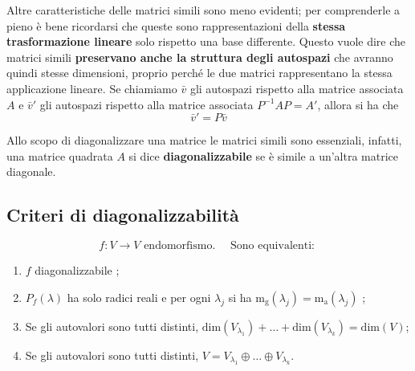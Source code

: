 \documentclass[x11names]{article}
\begin{document}
\noindent
Altre caratteristiche delle matrici simili sono meno evidenti; per comprenderle a pieno è bene ricordarsi che queste sono rappresentazioni della \textbf{stessa trasformazione lineare} solo rispetto una base differente. Questo vuole dire che matrici simili \textbf{preservano anche la struttura degli autospazi} che avranno quindi stesse dimensioni, proprio perché le due matrici rappresentano la stessa applicazione lineare. Se chiamiamo $\bar{v}$ gli autospazi rispetto alla matrice associata $A$ e $\bar{v}'$ gli autospazi rispetto alla matrice associata $P^{-1}AP = A'$, allora si ha che 
\[
\bar{v}' = P\bar{v}
\]

\noindent
Allo scopo di diagonalizzare una matrice le matrici simili sono essenziali, infatti, una matrice quadrata $A$ si dice \textbf{diagonalizzabile} se è simile a un'altra matrice diagonale.

\subsection{Criteri di diagonalizzabilità}
 \[
f: V \longrightarrow V \text{ endomorfismo.} \quad \text{ Sono equivalenti: }
\] 
\begin{enumerate}
	\item $f$ diagonalizzabile ;
	\item $P_{f}\left(\lambda\right)$ ha solo radici reali e per ogni $\lambda_{j}$ si ha $\text{m}_{\text{g}}\left(\lambda_{j}\right) = \text{m}_{\text{a}}\left(\lambda_{j}\right)$ ;
	\item Se gli autovalori sono tutti distinti, $\text{dim}\left(V_{\lambda_{1}}\right) + \dots + \text{dim}\left(V_{\lambda_{k}}\right) = \text{dim}\left(V\right)$;
	\item Se gli autovalori sono tutti distinti, $V = V_{\lambda_{1}} \oplus \dots \oplus V_{\lambda_{k}}$.
\end{enumerate}
\end{document}
